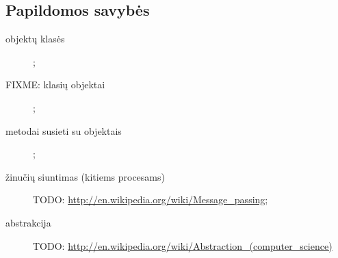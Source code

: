 \subsection{Papildomos savybės}

\begin{description}
  \item[objektų klasės] ;
  \item[FIXME: klasių objektai] ;
  \item[metodai susieti su objektais] ;
  \item[žinučių siuntimas (kitiems procesams)] 
    TODO: \url{http://en.wikipedia.org/wiki/Message_passing};
  \item[abstrakcija] 
    TODO: \url{http://en.wikipedia.org/wiki/Abstraction_(computer_science)}
\end{description}
